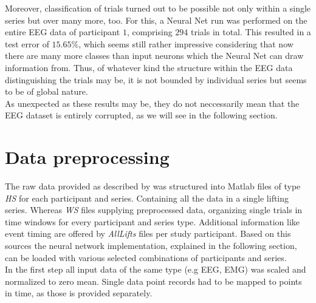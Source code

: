 \documentclass{article} %
\begin{document}
Moreover, classification of trials turned out to be possible not only within a single series but over many more, too. For this, a Neural Net run was performed on the entire EEG data of participant $1$, comprising $294$ trials in total. This resulted in a test error of $15.65\%$, which seems still rather impressive considering that now there are many more classes than input neurons which the Neural Net can draw information from.
Thus, of whatever kind the structure within the EEG data distinguishing the trials may be, it is not bounded by individual series but seems to be of global nature.\\
As unexpected as these results may be, they do not neccessarily mean that the EEG dataset is entirely corrupted, as we will see in the following section.


\section{Data preprocessing}
The raw data provided as described by \cite{nature} was structured into Matlab files of type \textit{HS} for each participant and series. Containing all the data in a single lifting series. Whereas \textit{WS} files supplying preprocessed data, organizing single trials in time windows for every participant and series type. Additional information like event timing are offered by \textit{AllLifts} files per study participant. Based on this sources the neural network implementation, explained in the following section, can be loaded with various selected combinations of participants and series.\\ In the first step all input data of the same type (e.g EEG, EMG) was scaled and normalized to zero mean. Single data point records had to be mapped to points in time, as those is provided separately.\\
\end{document}
